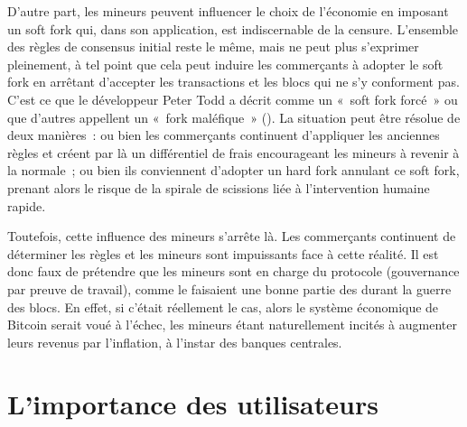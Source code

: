 D'autre part, les mineurs peuvent influencer le choix de l'économie en imposant un soft fork qui, dans son application, est indiscernable de la censure. L'ensemble des règles de consensus initial reste le même, mais ne peut plus s'exprimer pleinement, à tel point que cela peut induire les commerçants à adopter le soft fork en arrêtant d'accepter les transactions et les blocs qui ne s'y conforment pas. C'est ce que le développeur Peter Todd a décrit comme un «~soft fork forcé~» ou que d'autres appellent un «~fork maléfique~» (). La situation peut être résolue de deux manières~: ou bien les commerçants continuent d'appliquer les anciennes règles et créent par là un différentiel de frais encourageant les mineurs à revenir à la normale~; ou bien ils conviennent d'adopter un hard fork annulant ce soft fork, prenant alors le risque de la spirale de scissions liée à l'intervention humaine rapide.

Toutefois, cette influence des mineurs s'arrête là. Les commerçants continuent de déterminer les règles et les mineurs sont impuissants face à cette réalité. Il est donc faux de prétendre que les mineurs sont en charge du protocole (gouvernance par preuve de travail), comme le faisaient une bonne partie des  durant la guerre des blocs. En effet, si c'était réellement le cas, alors le système économique de Bitcoin serait voué à l'échec, les mineurs étant naturellement incités à augmenter leurs revenus par l'inflation, à l'instar des banques centrales.

\section*{L'importance des utilisateurs}

